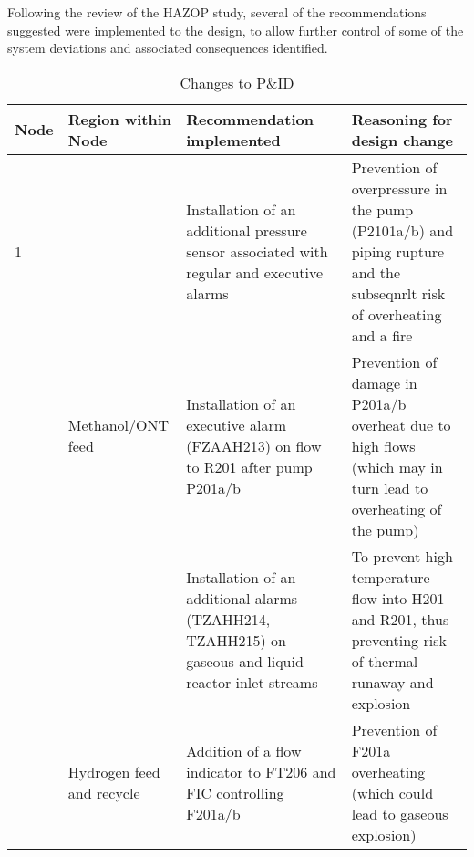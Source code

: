 Following the review of the HAZOP study, several of the recommendations suggested were implemented to the design, to allow further control of some of the system deviations and associated  consequences identified. 

\begin{table}[h]
\centering
\caption{Changes to P\&ID}
\label{tab:PIDchanges}
\begin{tabular}{@{}llll@{}}
\toprule
Node & Region within Node                         & Recommendation implemented                                                                                                                                    & Reasoning for design change                                                                                                                                                                                                                                                  \\ \midrule
1    & \multirow{3}{*}{Methanol/ONT feed}         & Installation of an additional pressure sensor associated with regular and executive alarms                                                                    & Prevention of overpressure in the pump (P2101a/b) and piping rupture and the subseqnrlt risk of overheating and a fire                                                                                     \\ \cmidrule(l){3-4} 
     &                                            & Installation of an executive alarm (FZAAH213) on flow to R201 after pump P201a/b                                                                              & Prevention of damage in P201a/b overheat due to high flows (which may in turn lead to overheating of the pump)                                                                                           \\ \cmidrule(l){3-4} 
     &                                            & Installation of an additional alarms (TZAHH214, TZAHH215) on gaseous and liquid reactor inlet streams                                                         & To prevent high-temperature flow into H201 and R201, thus preventing risk of thermal runaway and explosion                                                                                               \\ \cmidrule(l){2-4} 
     & \multirow{6}{*}{Hydrogen feed and recycle} & Addition of a flow indicator to FT206 and FIC controlling F201a/b                                                                                             & \multirow{2}{*}{Prevention of F201a overheating (which could lead to gaseous explosion)}                                                                                                                   \\ \cmidrule(lr){3-3}

\end{tabular}
\end{table}
